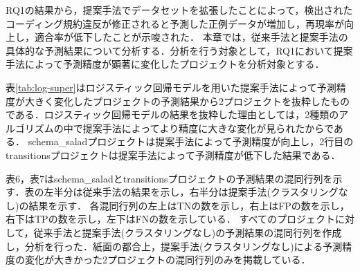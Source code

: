 \documentclass[submit,noauthor,ses,dvipdfmx]{ipsj}
\newcommand{\todo}[1]{\colorbox{yellow}{{\bf TODO}:}{\color{red} {\textbf{[#1]}}}}
\begin{document}


RQ1の結果から，提案手法でデータセットを拡張したことによって，検出されたコーディング規約違反が修正されると予測した正例データが増加し，再現率が向上し，適合率が低下したことが示唆された．
本章では，従来手法と提案手法の具体的な予測結果について分析する．分析を行う対象として，RQ1において提案手法によって予測精度が顕著に変化したプロジェクトを分析対象とする．

表\ref{tab:log-super}はロジスティック回帰モデルを用いた提案手法によって予測精度が大きく変化したプロジェクトの予測結果から2プロジェクトを抜粋したものである．ロジスティック回帰モデルの結果を抜粋した理由としては，2種類のアルゴリズムの中で提案手法によってより精度に大きな変化が見られたからである．
schema\_saladプロジェクトは提案手法によって予測精度が向上し，2行目のtransitionsプロジェクトは提案手法によって予測精度が低下した結果である．

表6，表7はschema\_saladとtransitionsプロジェクトの予測結果の混同行列を示す．表の左半分は従来手法の結果を示し，右半分は提案手法(クラスタリングなし)の結果を示す．
各混同行列の左上はTNの数を示し，右上はFPの数を示し，右下はTPの数を示し，左下はFNの数を示している．
すべてのプロジェクトに対して，従来手法と提案手法(クラスタリングなし)の予測結果の混同行列を作成し，分析を行った．紙面の都合上，提案手法(クラスタリングなし)による予測精度の変化が大きかった2プロジェクトの混同行列のみを掲載している．


\end{document}
